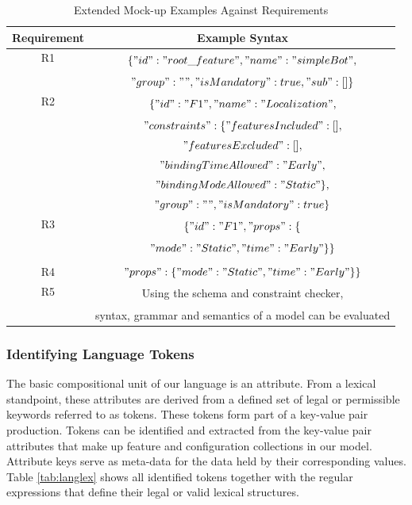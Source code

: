 \documentclass[conference]{IEEEtran}
\begin{document}
\begin{table}[H]
\caption{Extended Mock-up Examples Against Requirements}
\begin{center}
\begin{tabular}{c c}
\hline
    Requirement & Example Syntax  \\ \hline
     R1 & \multirow{2}{*}{$\{"id":"root\_feature","name":"simpleBot",$}\\
                        & \\
                        & $"group": "","isMandatory": true,"sub": []\}$\\ \hline
     R2 & \multirow{2}{*}{$\{"id": "F1","name": "Localization",$}\\ 
                        & \\
                        & $"constraints": \{"featuresIncluded": [],$\\ 
                        & $"featuresExcluded": [],$\\
                        &$"bindingTimeAllowed":"Early",$ \\
                        & $"bindingModeAllowed":"Static"\},$\\ 
                        & $"group": "","isMandatory": true\}$ \\
                         \hline
     R3 &  \multirow{2}{*}{$\{"id": "F1","props": \{$}\\
            & \\
            & $"mode": "Static","time": "Early"\}\}$\\
            & \\
            \hline
     R4 & $"props": \{"mode": "Static","time": "Early"\}\}$\\ \hline
     R5 & \multirow{2}{*}{Using the schema and constraint checker,}\\ 
        & \\
        & syntax, grammar and semantics of a model can be evaluated\\ \hline
\end{tabular}
\label{tab:reqext}
\end{center}
\end{table}

\subsubsection{Identifying Language Tokens}
The basic compositional unit of our language is an attribute. From a lexical standpoint, these attributes are derived from a defined set of legal or permissible keywords referred to as tokens. These tokens form part of a key-value pair production. Tokens can be identified and extracted from the key-value pair attributes that make up feature and configuration collections in our model. Attribute keys serve as meta-data for the data held by their corresponding values. Table \ref{tab:langlex} shows all identified tokens together with the regular expressions that define their legal or valid lexical structures.
\end{document}
